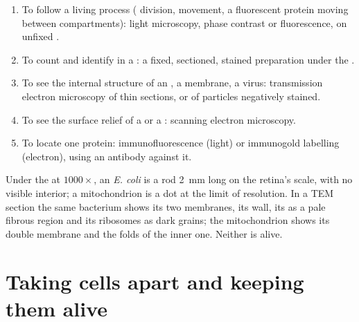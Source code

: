 \begin{method}\label{met:b1:cell-unit-of-life:choose}
\begin{enumerate}
  \item To follow a living process ( division, movement, a
        fluorescent protein moving between compartments): light
        microscopy, phase contrast or fluorescence, on unfixed .
  \item To count and identify  in a : a fixed, sectioned,
        stained preparation under the .
  \item To see the internal structure of an , a membrane, a
        virus: transmission electron microscopy of thin sections, or
        of particles negatively stained.
  \item To see the surface relief of a  or a : scanning
        electron microscopy.
  \item To locate one protein: immunofluorescence (light) or
        immunogold labelling (electron), using an antibody against it.
\end{enumerate}
\end{method}

\begin{example}\label{ex:b1:cell-unit-of-life:seeing}
Under the  at $1000\times$, an \emph{E. coli}  is a
rod \qty{2}{mm} long on the retina's scale, with no visible interior;
a mitochondrion is a dot at the limit of resolution. In a TEM section
the same bacterium shows its two membranes, its wall, its  as
a pale fibrous region and its ribosomes as dark grains; the
mitochondrion shows its double membrane and the folds of the inner one.
Neither is alive.
\end{example}

\section{Taking cells apart and keeping them alive}

